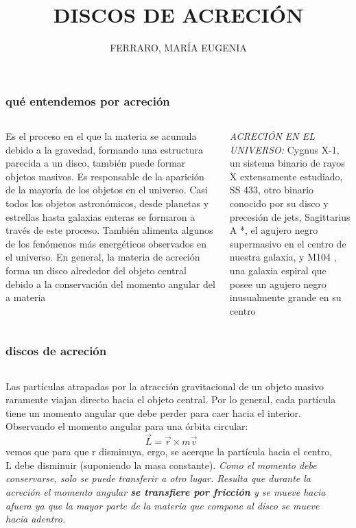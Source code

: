 \documentclass{beamer}
\title[Título corto]{DISCOS DE ACRECIÓN}
\subtitle{} %
\author{FERRARO, MARÍA EUGENIA}
\institute{} %
\begin{document}
\begin{frame}
\titlepage
\end{frame}


\begin{frame}
\frametitle{qué entendemos por acreción}
\begin{columns}
\begin{column}{0.60\textwidth}
 \justify
 \vspace{-0.7cm}
 Es el proceso en el que la materia se acumula debido a la gravedad, formando una estructura
 parecida a un disco, también puede formar objetos masivos. Es  
 responsable de la aparición de la mayoría de los objetos en el universo. Casi todos los 
 objetos astronómicos, desde planetas y estrellas hasta galaxias enteras se formaron a 
 través de este proceso. También alimenta algunos de los fenómenos más energéticos 
 observados en el universo. En general, la materia de acreción forma un disco alrededor 
 del objeto central debido a la conservación del momento angular del a materia 
\end{column}
\begin{column}{0.4\textwidth}
 {\it \textcolor{lilita}{ACRECIÓN EN EL UNIVERSO:}}
 Cygnus X-1, un sistema binario de rayos X extensamente estudiado, SS 433, otro binario
 conocido por su disco y precesión de jets, Sagittarius A *, el agujero negro supermasivo 
 en el centro de nuestra galaxia, y M104 , una galaxia espiral que posee un agujero negro 
 inusualmente grande en su centro
\end{column}
\end{columns}
\end{frame}



\begin{frame}
\frametitle{discos de acreción}
\begin{columns}
\begin{column}{1\textwidth}
 \justify
Las partículas atrapadas por la atracción gravitacional de un objeto masivo raramente
viajan directo hacia el objeto central. Por lo general, cada partícula tiene un momento
angular que debe perder para caer hacia el interior. Observando el momento angular
para una órbita circular:
\begin{equation*}
 \vec{L}=\vec{r}\times m\vec{v}
\end{equation*}
vemos que para que r disminuya, ergo, se acerque la partícula hacia el centro,
L debe disminuir (suponiendo la masa constante). \textcolor{lilaoscuro}{\textit
{Como el momento debe conservarse,
solo se puede transferir a otro lugar. Resulta que durante la acreción el momento angular
\textbf{\textit{ se transfiere por fricción}} y se mueve hacia afuera ya que la mayor parte de la
materia que compone al disco se mueve hacia adentro.}}
\end{column}
\begin{column}{0.0\textwidth}
\end{column}
\end{columns}
\end{frame}
\end{document}
